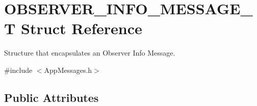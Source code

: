 \hypertarget{struct_o_b_s_e_r_v_e_r___i_n_f_o___m_e_s_s_a_g_e___t}{}\section{O\+B\+S\+E\+R\+V\+E\+R\+\_\+\+I\+N\+F\+O\+\_\+\+M\+E\+S\+S\+A\+G\+E\+\_\+\+T Struct Reference}
\label{struct_o_b_s_e_r_v_e_r___i_n_f_o___m_e_s_s_a_g_e___t}


Structure that encapsulates an Observer Info Message.  




{\ttfamily \#include $<$App\+Messages.\+h$>$}

\subsection*{Public Attributes}
